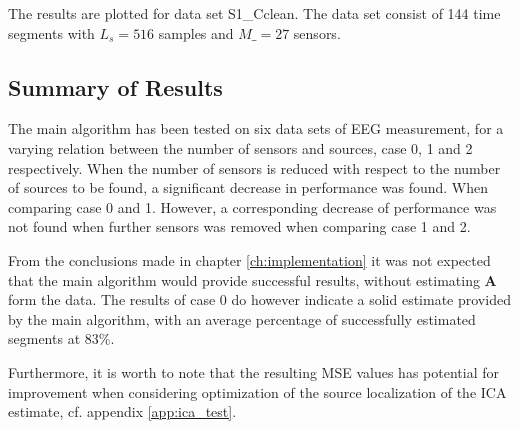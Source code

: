The results are plotted for data set S1\_Cclean. 
The data set consist of 144 time segments with $L_s = 516$ samples and $M\_ = 27$ sensors. 


\subsection{Summary of Results}
The main algorithm has been tested on six data sets of EEG measurement, for a varying relation between the number of sensors and sources, case 0, 1 and 2 respectively.
When the number of sensors is reduced with respect to the number of sources to be found, a significant decrease in performance was found. When comparing case 0 and 1. 
However, a corresponding decrease of performance was not found when further sensors was removed when comparing case 1 and 2. 

From the conclusions made in chapter \ref{ch:implementation} it was not expected that the main algorithm would provide successful results, without estimating $\mathbf{A}$ form the data. 
The results of case 0 do however indicate a solid estimate provided by the main algorithm, with an average percentage of successfully estimated segments at $83\%$. 

Furthermore, it is worth to note that the resulting MSE values has potential for improvement when considering optimization of the source localization of the ICA estimate, cf. appendix \ref{app:ica_test}.




